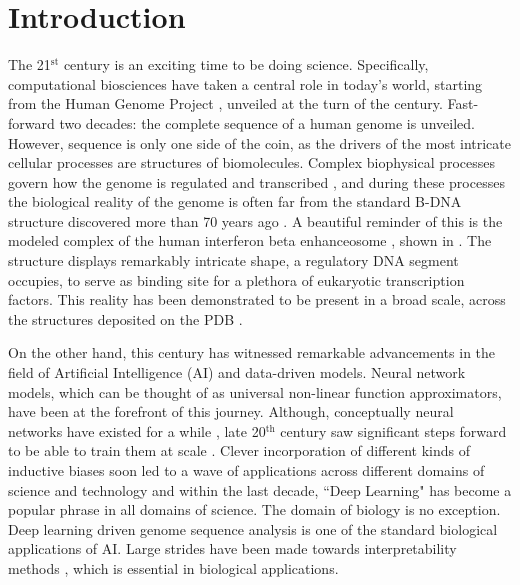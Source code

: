 \section*{Introduction}

The 21$^{\text{st}}$ century is an exciting time to be doing science. Specifically, computational biosciences have taken a central role in today's world, starting from the Human Genome Project \citep{international2001initial}, unveiled at the turn of the century. Fast-forward  two decades: the complete sequence of a human genome  \citep{nurk2022complete} is unveiled. However, sequence is only one side of the coin, as the drivers of the most intricate cellular processes are structures of biomolecules. Complex biophysical processes govern how the genome is regulated and transcribed \citep{lambert2018human}, and during these processes the biological reality of the genome is often far from the standard B-DNA structure discovered more than 70 years ago \citep{watson1953}. A beautiful reminder of this is the modeled complex of the human interferon beta enhanceosome \citep{panne2007atomic}, shown in . The structure displays remarkably intricate shape, a regulatory DNA segment occupies, to serve as binding site for a plethora of eukaryotic transcription factors. This reality has been demonstrated \citep{rohs2009role} to be present in a broad scale, across the structures deposited on the PDB \citep{berman2000protein}. 

On the other hand, this century has witnessed remarkable advancements in the field of Artificial Intelligence (AI) and data-driven models. Neural network models, which can be thought of as universal non-linear function approximators, have been at the forefront of this journey. Although, conceptually neural networks have existed for a while \citep{kleene1951representationof}, late 20$^{\text{th}}$ century saw significant steps forward to be able to train them at scale \citep{linnainmaa1976taylor, rumelhart1986learning,anderson2000talking,}. Clever incorporation of different kinds of inductive biases soon led to a wave of applications across different domains of science and technology \citep{lecun1989backpropagation, krizhevsky2012imagenet,lecun1998gradient,lecun1995convolutional,deng2009imagenet} and within the last decade, ``Deep Learning" \citep{lecun2015deep} has become a popular phrase in all domains of science. The domain of biology is no exception. Deep learning driven genome sequence analysis \citep{kelley2018sequential} is one of the standard biological applications of AI. Large strides have been made towards interpretability methods \citep{shrikumar2017learning}, which is essential in biological applications.

